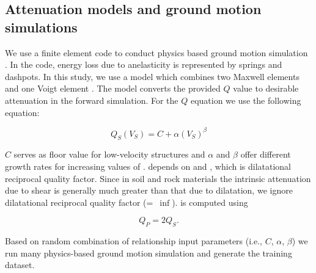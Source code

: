 \subsection{Attenuation models and ground motion simulations}
We use a finite element code to conduct physics based ground motion simulation \citep[for more details see ][]{Tu_2006_Proc,Taborda_2010_Tech}. 
In the code, energy loss due to anelasticity is represented by springs and dashpots. In this study, we use a model which combines two Maxwell elements and one Voigt element \citep{Bielak_2011_G}. The model converts the provided $Q$ value to desirable attenuation in the forward simulation. For the $Q$ equation we use the following equation: 

\begin{equation}
Q_{S}(V_{S}) = C + \alpha(V_{S})^{\beta}
\end{equation}

$C$ serves as floor value for low-velocity structures and $\alpha$ and $\beta$ offer different growth rates for increasing values of \vs{}. \qp{} depends on \qs{} and \qk{}, which is dilatational reciprocal quality factor. Since in soil and rock materials the intrinsic attenuation due to shear is generally much greater than that due to dilatation, we ignore dilatational reciprocal quality factor (\qk{}=~$\inf$). \qp{} is computed using

\begin{equation}
Q_{P}=2Q_{S}.
\end{equation}

Based on random combination of \qsvs{} relationship input parameters (i.e., $C$, $\alpha$, $\beta$) we run many physics-based ground motion simulation and generate the training dataset. 